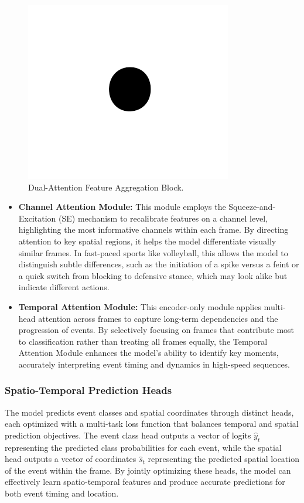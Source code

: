 \documentclass[conference]{IEEEtran}
\begin{document}
\begin{figure}[htbp]
    \centerline{\includegraphics{fig1.png}}
    \caption{Dual-Attention Feature Aggregation Block.}
    \label{fig2}
    \end{figure}

\begin{itemize}
    \item \textbf{Channel Attention Module:} This module employs the Squeeze-and-Excitation (SE) mechanism \cite{8578843} to recalibrate features on a channel level, highlighting the most informative channels within each frame. By directing attention to key spatial regions, it helps the model differentiate visually similar frames. In fast-paced sports like volleyball, this allows the model to distinguish subtle differences, such as the initiation of a spike versus a feint or a quick switch from blocking to defensive stance, which may look alike but indicate different actions.

    \item \textbf{Temporal Attention Module:} This encoder-only module applies multi-head attention \cite{10.5555/3295222.3295349} across frames to capture long-term dependencies and the progression of events. By selectively focusing on frames that contribute most to classification rather than treating all frames equally, the Temporal Attention Module enhances the model's ability to identify key moments, accurately interpreting event timing and dynamics in high-speed sequences.
\end{itemize}


\subsubsection{Spatio-Temporal Prediction Heads}
The model predicts event classes and spatial coordinates through distinct heads, each optimized with a multi-task loss function that balances temporal and spatial prediction objectives. The event class head outputs a vector of logits \(\hat{y}_t\) representing the predicted class probabilities for each event, while the spatial head outputs a vector of coordinates \(\hat{s}_t\) representing the predicted spatial location of the event within the frame. By jointly optimizing these heads, the model can effectively learn spatio-temporal features and produce accurate predictions for both event timing and location.
\end{document}
